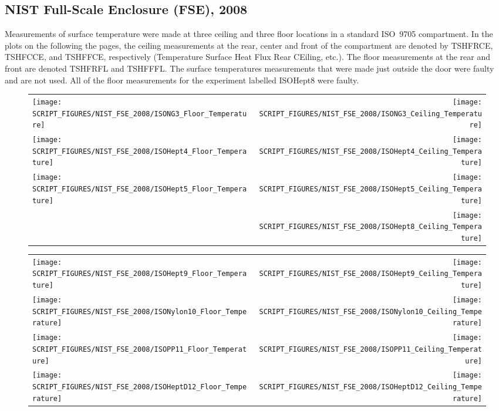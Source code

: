\clearpage

\subsection{NIST Full-Scale Enclosure (FSE), 2008}

Measurements of surface temperature were made at three ceiling and three floor locations in a standard ISO~9705 compartment. In the plots on the following the pages, the ceiling measurements at the rear, center and front of the compartment are denoted by TSHFRCE, TSHFCCE, and TSHFFCE, respectively (Temperature Surface Heat Flux Rear CEiling, etc.). The floor measurements at the rear and front are denoted TSHFRFL and TSHFFFL. The surface temperatures measurements that were made just outside the door were faulty and are not used. All of the floor measurements for the experiment labelled ISOHept8 were faulty.

\newpage

\begin{figure}[p]
\begin{tabular*}{\textwidth}{l@{\extracolsep{\fill}}r}
\texttt{[image: SCRIPT\_FIGURES/NIST\_FSE\_2008/ISONG3\_Floor\_Temperature]} &
\texttt{[image: SCRIPT\_FIGURES/NIST\_FSE\_2008/ISONG3\_Ceiling\_Temperature]} \\
\texttt{[image: SCRIPT\_FIGURES/NIST\_FSE\_2008/ISOHept4\_Floor\_Temperature]} &
\texttt{[image: SCRIPT\_FIGURES/NIST\_FSE\_2008/ISOHept4\_Ceiling\_Temperature]} \\
\texttt{[image: SCRIPT\_FIGURES/NIST\_FSE\_2008/ISOHept5\_Floor\_Temperature]} &
\texttt{[image: SCRIPT\_FIGURES/NIST\_FSE\_2008/ISOHept5\_Ceiling\_Temperature]} \\
 &
\texttt{[image: SCRIPT\_FIGURES/NIST\_FSE\_2008/ISOHept8\_Ceiling\_Temperature]}
\end{tabular*}
\label{NIST_FSE_2008_Surface_Temp_1}
\end{figure}

\begin{figure}[p]
\begin{tabular*}{\textwidth}{l@{\extracolsep{\fill}}r}
\texttt{[image: SCRIPT\_FIGURES/NIST\_FSE\_2008/ISOHept9\_Floor\_Temperature]} &
\texttt{[image: SCRIPT\_FIGURES/NIST\_FSE\_2008/ISOHept9\_Ceiling\_Temperature]} \\
\texttt{[image: SCRIPT\_FIGURES/NIST\_FSE\_2008/ISONylon10\_Floor\_Temperature]} &
\texttt{[image: SCRIPT\_FIGURES/NIST\_FSE\_2008/ISONylon10\_Ceiling\_Temperature]} \\
\texttt{[image: SCRIPT\_FIGURES/NIST\_FSE\_2008/ISOPP11\_Floor\_Temperature]} &
\texttt{[image: SCRIPT\_FIGURES/NIST\_FSE\_2008/ISOPP11\_Ceiling\_Temperature]} \\
\texttt{[image: SCRIPT\_FIGURES/NIST\_FSE\_2008/ISOHeptD12\_Floor\_Temperature]} &
\texttt{[image: SCRIPT\_FIGURES/NIST\_FSE\_2008/ISOHeptD12\_Ceiling\_Temperature]}
\end{tabular*}
\label{NIST_FSE_2008_Surface_Temp_2}
\end{figure}

